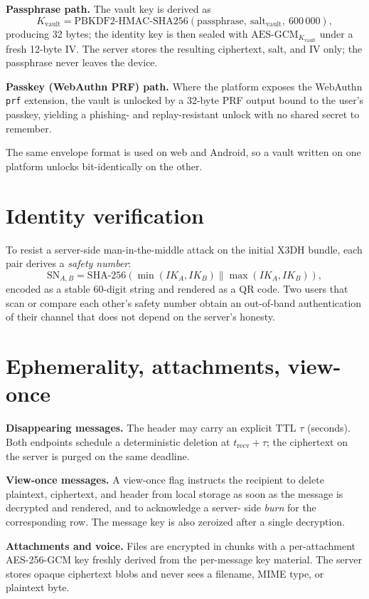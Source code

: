\documentclass[11pt,a4paper]{article}
\newcommand{\code}[1]{\texttt{\small #1}}
\begin{document}
\textbf{Passphrase path.} The vault key is derived as
\[
K_\text{vault} = \mathrm{PBKDF2\text{-}HMAC\text{-}SHA256}
  (\text{passphrase},\ \text{salt}_\text{vault},\ 600\,000),
\]
producing 32 bytes; the identity key is then sealed with
$\mathrm{AES\text{-}GCM}_{K_\text{vault}}$ under a fresh 12-byte IV.
The server stores the resulting ciphertext, salt, and IV only; the
passphrase never leaves the device.

\textbf{Passkey (WebAuthn PRF) path.} Where the platform exposes the
WebAuthn \code{prf} extension, the vault is unlocked by a 32-byte PRF
output bound to the user's passkey, yielding a phishing- and
replay-resistant unlock with no shared secret to remember.

The same envelope format is used on web and Android, so a vault written
on one platform unlocks bit-identically on the other.

\section{Identity verification}

To resist a server-side man-in-the-middle attack on the initial X3DH
bundle, each pair derives a \emph{safety number}:
\[
\mathrm{SN}_{A,B} = \mathrm{SHA\text{-}256}(\min(IK_A, IK_B) \| \max(IK_A, IK_B)),
\]
encoded as a stable 60-digit string and rendered as a QR code. Two users
that scan or compare each other's safety number obtain an out-of-band
authentication of their channel that does not depend on the server's
honesty.

\section{Ephemerality, attachments, view-once}

\textbf{Disappearing messages.} The header may carry an explicit TTL
$\tau$ (seconds). Both endpoints schedule a deterministic deletion at
$t_\text{recv} + \tau$; the ciphertext on the server is purged on the
same deadline.

\textbf{View-once messages.} A view-once flag instructs the recipient
to delete plaintext, ciphertext, and header from local storage as soon
as the message is decrypted and rendered, and to acknowledge a server-
side \emph{burn} for the corresponding row. The message key is also
zeroized after a single decryption.

\textbf{Attachments and voice.} Files are encrypted in chunks with a
per-attachment AES-256-GCM key freshly derived from the per-message key
material. The server stores opaque ciphertext blobs and never sees a
filename, MIME type, or plaintext byte.
\end{document}
